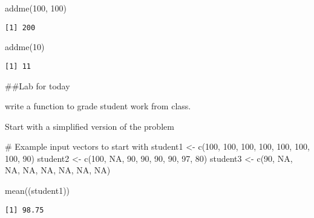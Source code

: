 \documentclass[
  letterpaper,
  DIV=11,
  numbers=noendperiod]{scrartcl}
\newenvironment{Shaded}{\begin{snugshade}}{\end{snugshade}}
\newcommand{\CommentTok}[1]{\textcolor[rgb]{0.37,0.37,0.37}{#1}}
\newcommand{\ConstantTok}[1]{\textcolor[rgb]{0.56,0.35,0.01}{#1}}
\newcommand{\DecValTok}[1]{\textcolor[rgb]{0.68,0.00,0.00}{#1}}
\newcommand{\FunctionTok}[1]{\textcolor[rgb]{0.28,0.35,0.67}{#1}}
\newcommand{\NormalTok}[1]{\textcolor[rgb]{0.00,0.23,0.31}{#1}}
\newcommand{\OtherTok}[1]{\textcolor[rgb]{0.00,0.23,0.31}{#1}}
\begin{document}
\begin{Shaded}
\begin{Highlighting}[]
\FunctionTok{addme}\NormalTok{(}\DecValTok{100}\NormalTok{, }\DecValTok{100}\NormalTok{)}
\end{Highlighting}
\end{Shaded}

\begin{verbatim}
[1] 200
\end{verbatim}

\begin{Shaded}
\begin{Highlighting}[]
\FunctionTok{addme}\NormalTok{(}\DecValTok{10}\NormalTok{)}
\end{Highlighting}
\end{Shaded}

\begin{verbatim}
[1] 11
\end{verbatim}

\#\#Lab for today

write a function to grade student work from class.

Start with a simplified version of the problem

\begin{Shaded}
\begin{Highlighting}[]
\CommentTok{\# Example input vectors to start with}
\NormalTok{student1 }\OtherTok{\textless{}{-}} \FunctionTok{c}\NormalTok{(}\DecValTok{100}\NormalTok{, }\DecValTok{100}\NormalTok{, }\DecValTok{100}\NormalTok{, }\DecValTok{100}\NormalTok{, }\DecValTok{100}\NormalTok{, }\DecValTok{100}\NormalTok{, }\DecValTok{100}\NormalTok{, }\DecValTok{90}\NormalTok{)}
\NormalTok{student2 }\OtherTok{\textless{}{-}} \FunctionTok{c}\NormalTok{(}\DecValTok{100}\NormalTok{, }\ConstantTok{NA}\NormalTok{, }\DecValTok{90}\NormalTok{, }\DecValTok{90}\NormalTok{, }\DecValTok{90}\NormalTok{, }\DecValTok{90}\NormalTok{, }\DecValTok{97}\NormalTok{, }\DecValTok{80}\NormalTok{)}
\NormalTok{student3 }\OtherTok{\textless{}{-}} \FunctionTok{c}\NormalTok{(}\DecValTok{90}\NormalTok{, }\ConstantTok{NA}\NormalTok{, }\ConstantTok{NA}\NormalTok{, }\ConstantTok{NA}\NormalTok{, }\ConstantTok{NA}\NormalTok{, }\ConstantTok{NA}\NormalTok{, }\ConstantTok{NA}\NormalTok{, }\ConstantTok{NA}\NormalTok{)}


\FunctionTok{mean}\NormalTok{((student1))}
\end{Highlighting}
\end{Shaded}

\begin{verbatim}
[1] 98.75
\end{verbatim}
\end{document}

